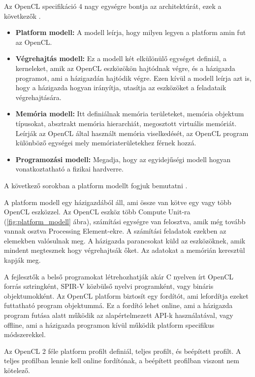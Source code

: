 Az OpenCL specifikáció 4 nagy egységre bontja az architektúrát, ezek a következők \cite{spec}.
\begin{itemize}
\item \textbf{Platform modell:} A modell leírja, hogy milyen legyen a platform amin fut az OpenCL. 
\item \textbf{Végrehajtás modell:} Ez a modell két elkülönülő egységet definiál, a kerneleket, amik az OpenCL eszközökön hajtódnak végre, és a házigazda programot, ami a házigazdán hajtódik végre. Ezen kívül a modell leírja azt is, hogy a házigazda hogyan irányítja, utasítja az eszközöket a feladataik végrehajtására.
\item \textbf{Memória modell:} Itt definiálnak memória területeket,  memória objektum típusokat, absztrakt memória hierarchiát, megosztott virtuális memóriát. Leírják az OpenCL által használt memória viselkedését, az OpenCL program különböző egységei mely memóriaterületekhez férnek hozzá.
\item \textbf{Programozási modell:} Megadja, hogy az egyidejűségi modell hogyan vonatkoztatható a fizikai hardverre.

\end{itemize}

A következő sorokban a platform modellt fogjuk bemutatni \cite{spec}.

A platform modell egy házigazdából áll, ami össze van kötve egy vagy több OpenCL eszközzel. Az OpenCL eszköz több Compute Unit-ra (\ref{fig:platform_modell} ábra), számítási egységre van felosztva, amik még tovább vannak osztva Processing Element-ekre. A számítási feladatok ezekben az elemekben valósulnak meg. A házigazda parancsokat küld az eszközöknek, amik mindent megtesznek hogy végrehajtsák őket. Az adatokat a memórián keresztül kapják meg. 

A fejlesztők a belső programokat létrehozhatják akár C nyelven írt OpenCL forrás sztringként, SPIR-V közbülső nyelvi programként, vagy bináris objektumokként. Az OpenCL platform biztosít egy fordítót, ami lefordítja ezeket futtatható program objektummá. Ez a fordító lehet online, ami a házigazda program futása alatt működik az alapértelmezett API-k használatával, vagy offline, ami a házigazda programon kívül működik platform specifikus módszerekkel.

Az OpenCL 2 féle platform profilt definiál, teljes profilt, és beépített profilt. A teljes profilban lennie kell online fordítónak, a beépített profilban viszont nem kötelező.

